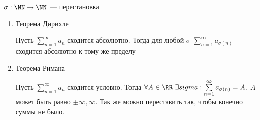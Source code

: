 \begin{exercise}{}{}
    \( \sigma : \NN \to \NN \) --- перестановка

    \begin{enumerate}{}{}
        \item
            Теорема Дирихле

            Пусть \( \sum\limits_{n = 1}^{\infty} a_n \) сходится абсолютно.
            Тогда для любой \( \sigma \) \( \sum\limits_{n = 1}^{\infty} a_{\sigma(n)} \) 
            сходится абсолютно к тому же пределу
        \item
            Теорема Римана

            Пусть \( \sum\limits_{n = 1}^{\infty} a_n \) сходится условно.
            Тогда \( \forall A \in \RR \ \exists sigma : \sum\limits_{n = 1}^{\infty} a_{\sigma(n)} = A \).
            \( A \) может быть равно \( \pm \infty, \infty \).
            Так же можно переставить так, чтобы конечно суммы не было.
    \end{enumerate}
\end{exercise}
